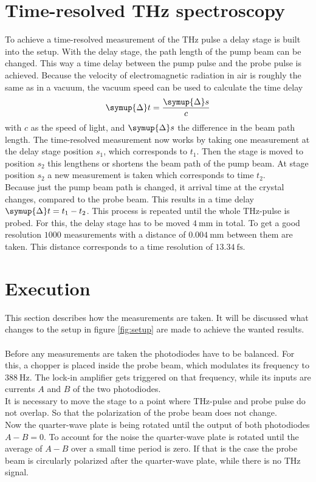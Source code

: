 \section{Time-resolved THz spectroscopy}
\label{sec:time_domain}
To achieve a time-resolved measurement of the $\si{\tera\hertz}$ pulse a delay stage is built into the setup.
With the delay stage, the path length of the pump beam can be changed.
This way a time delay between the pump pulse and the probe pulse is achieved.
Because the velocity of electromagnetic radiation in air is roughly the same as in a vacuum, the vacuum speed can be used to calculate the time delay   
\begin{equation}
    \symup{\Delta} t = \frac{\symup{\Delta} s}{c}
\end{equation}
with $c$ as the speed of light, and $\symup{\Delta} s$ the difference in the beam path length.
The time-resolved measurement now works by taking one measurement at the delay stage position $s_1$, which corresponds to $t_1$.
Then the stage is moved to position $s_2$ this lengthens or shortens the beam path of the pump beam.
At stage position $s_2$ a new measurement is taken which corresponds to time $t_2$.
\\
Because just the pump beam path is changed, it arrival time at the crystal changes, compared to the probe beam.
This results in a time delay $\symup{\Delta} t = t_1-t_2$.
This process is repeated until the whole $\si{\tera\hertz}$-pulse is probed.
For this, the delay stage has to be moved $\SI{4}{\milli\meter}$ in total.
To get a good resolution $1000$ measurements with a distance of $\SI{0.004}{\milli\meter}$ between them are taken.
This distance corresponds to a time resolution of $\SI{13.34}{\femto\second}$.

\section{Execution}
\label{sec:execution}
This section describes how the measurements are taken. 
It will be discussed what changes to the setup in figure \ref{fig:setup} are made to achieve the wanted results.
\\\\
Before any measurements are taken the photodiodes have to be balanced.
For this, a chopper is placed inside the probe beam, which modulates its frequency to $\SI{388}{\hertz}$.
The lock-in amplifier gets triggered on that frequency, while its inputs are currents $A$ and $B$ of the two photodiodes.
\\
It is necessary to move the stage to a point where $\si{\tera\hertz}$-pulse and probe pulse do not overlap.
So that the polarization of the probe beam does not change.
\\
Now the quarter-wave plate is being rotated until the output of both photodiodes $A-B = 0$.
To account for the noise the quarter-wave plate is rotated until the average of $A-B$ over a small time period is zero.
If that is the case the probe beam is circularly polarized after the quarter-wave plate, while there is no $\si{\tera\hertz}$ signal.
